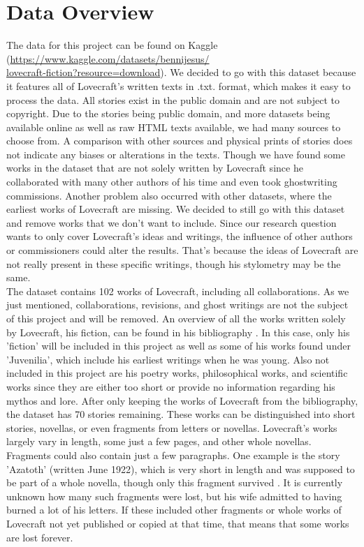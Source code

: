 \section{Data Overview}

The data for this project can be found on Kaggle (\href{https://www.kaggle.com/datasets/bennijesus/lovecraft-fiction?resource=download}{https://www.kaggle.com/datasets/bennijesus/\\lovecraft-fiction?resource=download}). We decided to go with this dataset because it 
features all of Lovecraft's written texts in .txt. format, which makes it easy to process the data. 
All stories exist in the public domain and are not subject to copyright. Due to the stories being 
public domain, and more datasets being available online as well as raw HTML texts available, we 
had many sources to choose from. A comparison with other sources and physical prints of stories 
does not indicate any biases or alterations in the texts. Though we have found some works in the 
dataset that are not solely written by Lovecraft since he collaborated with many other authors of 
his time and even took ghostwriting commissions. Another problem also occurred with other datasets, 
where the earliest works of Lovecraft are missing. We decided to still go with this dataset and 
remove works that we don't want to include. Since our research question wants to only cover 
Lovecraft's ideas and writings, the influence of other authors or commissioners could alter the 
results. That's because the ideas of Lovecraft are not really present in these specific writings, 
though his stylometry may be the same.\\

The dataset contains 102 works of Lovecraft, including all collaborations. As we just mentioned, 
collaborations, revisions, and ghost writings are not the subject of this project and will be 
removed. An overview of all the works written solely by Lovecraft, his fiction, can be found in 
his bibliography \cite{lc}. In this case, only his 'fiction' will be included in this project 
as well as some of his works found under 'Juvenilia', which include his earliest writings when he 
was young. Also not included in this project are his poetry works, philosophical works, and 
scientific works since they are either too short or provide no information regarding his mythos 
and lore. After only keeping the works of Lovecraft from the bibliography, the dataset has 70 
stories remaining. These works can be distinguished into short stories, novellas, or even fragments 
from letters or novellas. Lovecraft's works largely vary in length, some just a few pages, and 
other whole novellas. Fragments could also contain just a few paragraphs. One example is the 
story 'Azatoth' (written June 1922), which is very short in length and was supposed to be part 
of a whole novella, though only this fragment survived \cite{joshi}. It is currently unknown how many such 
fragments were lost, but his wife admitted to having burned a lot of his letters. If these included 
other fragments or whole works of Lovecraft not yet published or copied at that time, that means 
that some works are lost forever.\\

